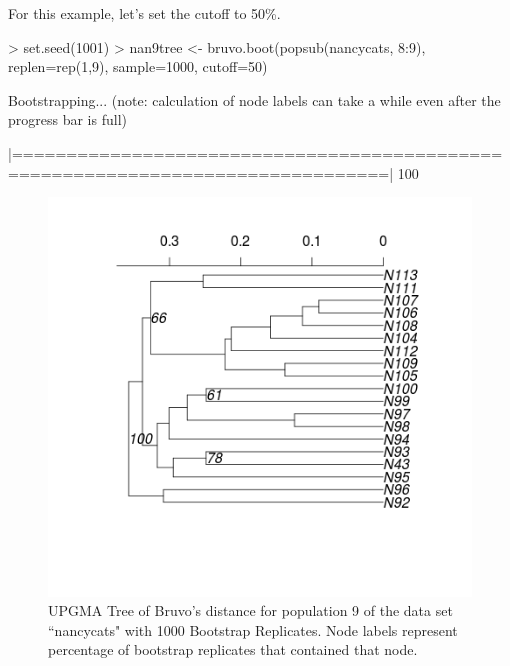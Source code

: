 \documentclass[letterpaper]{article}
\begin{document}
For this example, let's set the cutoff to 50\%.
\begin{Schunk}
\begin{Sinput}
> set.seed(1001)
> nan9tree <- bruvo.boot(popsub(nancycats, 8:9), replen=rep(1,9), sample=1000, cutoff=50)
\end{Sinput}
\end{Schunk}
\begin{Schunk}
\begin{Soutput}
Bootstrapping... (note: calculation of node labels can take a while even after the progress bar is full)
\end{Soutput}
\begin{Soutput}
|================================================================================| 100%
\end{Soutput}
\end{Schunk}
\begin{figure}[h!]
  \centering
  \caption{\footnotesize UPGMA Tree of Bruvo's distance for population 9 of the data set ``nancycats" with 1000 Bootstrap Replicates. Node labels represent percentage of bootstrap replicates that contained that node.}
  \label{bruvo_upgma}
  \includegraphics{bruvo_upgma.png}


\end{figure}
\end{document}
